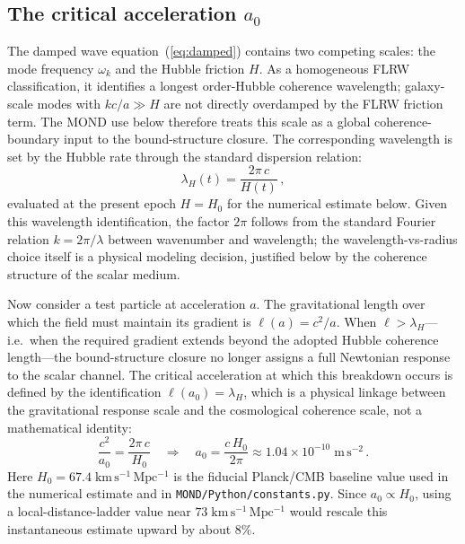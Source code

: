 \documentclass[aps,prd,onecolumn,superscriptaddress,nofootinbib,showpacs,12pt]{revtex4-2}
\newcommand{\azero}{a_{0}}
\begin{document}
\subsection{The critical acceleration $\azero$}
\label{sec:a0}

The damped wave equation~(\ref{eq:damped}) contains two
competing scales: the mode frequency $\omega_{k}$ and the
Hubble friction $H$.  As a homogeneous FLRW classification,
it identifies a longest order-Hubble coherence wavelength;
galaxy-scale modes with $kc/a\gg H$ are not directly
overdamped by the FLRW friction term.  The MOND use below
therefore treats this scale as a global coherence-boundary
input to the bound-structure closure.  The corresponding
wavelength is set by the Hubble rate through the standard
dispersion relation:
\begin{equation}\label{eq:dispersion}
  \lambda_{H}(t) = \frac{2\pi\,c}{H(t)}\,,
\end{equation}
evaluated at the present epoch $H=H_{0}$ for the
numerical estimate below.  Given this wavelength
identification, the factor $2\pi$ follows from the standard
Fourier relation $k=2\pi/\lambda$ between wavenumber and
wavelength; the wavelength-vs-radius choice itself is a
physical modeling decision, justified below by the
coherence structure of the scalar medium.

Now consider a test particle at acceleration $a$.  The
gravitational length over which the field must maintain
its gradient is $\ell(a) = c^{2}/a$.  When
$\ell > \lambda_{H}$---i.e.\ when the required gradient
extends beyond the adopted Hubble coherence length---the
bound-structure closure no longer assigns a full Newtonian
response to the scalar channel.
The critical acceleration at which this breakdown occurs
is defined by the identification $\ell(\azero) = \lambda_{H}$,
which is a physical linkage between the gravitational
response scale and the cosmological coherence scale, not a
mathematical identity:
\begin{equation}\label{eq:a0_derivation}
  \frac{c^{2}}{\azero} = \frac{2\pi\,c}{H_{0}}
  \quad\Longrightarrow\quad
  \boxed{\azero = \frac{c\,H_{0}}{2\pi}
    \approx 1.04\times 10^{-10}\;\mathrm{m\,s^{-2}}\,.}
\end{equation}
Here $H_{0}=67.4\;\mathrm{km\,s^{-1}\,Mpc^{-1}}$
is the fiducial Planck/CMB baseline value used in
the numerical estimate and in
\texttt{MOND/Python/constants.py}.  Since
$\azero\propto H_{0}$, using a local-distance-ladder
value near $73\;\mathrm{km\,s^{-1}\,Mpc^{-1}}$ would
rescale this instantaneous estimate upward by about
$8\%$.
\end{document}
